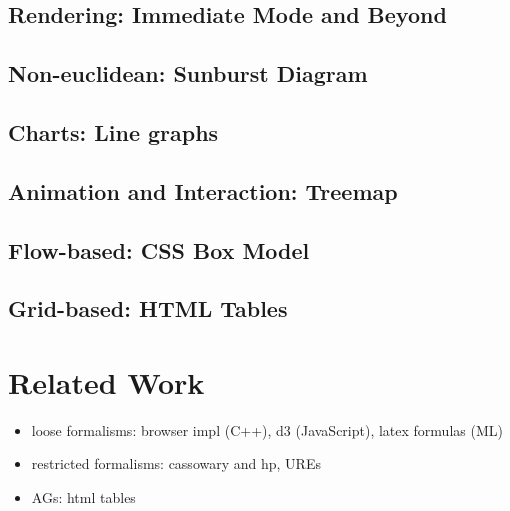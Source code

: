 \subsection{Rendering: Immediate Mode and Beyond}
\subsection{Non-euclidean: Sunburst Diagram}
\subsection{Charts: Line graphs}
\subsection{Animation and Interaction: Treemap}
\subsection{Flow-based: CSS Box Model}
\subsection{Grid-based: HTML Tables}

\section{Related Work}
\begin{itemize}
\item loose formalisms: browser impl (C++), d3 (JavaScript), latex formulas (ML)
\item restricted formalisms: cassowary and hp, UREs
\item AGs: html tables
\end{itemize}



